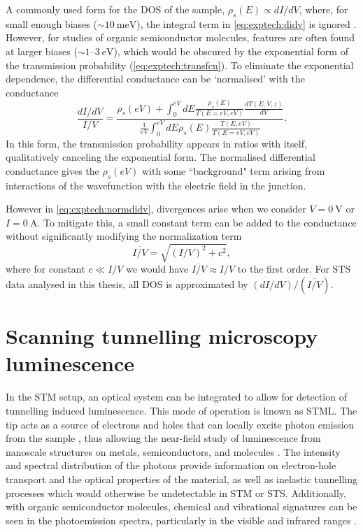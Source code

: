 A commonly used form for the \ac{DOS} of the sample, $\rho_s(E) \propto dI/dV $, where, for small enough biases ($\sim \SI{10}{\milli\electronvolt}$), the integral term in \autoref{eq:exptech:didv} is ignored \citep{feenstra1993methods}. However, for studies of organic semiconductor molecules, features are often found at larger biases ($\sim 1$--$\SI{3}{\electronvolt}$), which would be obscured by the exponential form of the transmission probability (\autoref{eq:exptech:transfcn}). To eliminate the exponential dependence, the differential conductance can be `normalised' with the conductance  \citep{feenstra1987atom}
\begin{equation} \label{eq:exptech:normdidv}
\frac{dI/dV}{I/V} = \frac{\rho_s(eV) + \int_0 ^{eV} dE \frac{\rho_s(E)}{T(E=eV,eV)} \frac{dT(E,V,z)}{dV}}{ \frac{1}{eV} \int_0^{eV} dE \rho_s(E) \frac{T(E,eV)}{T(E=eV,eV)}}.
\end{equation}
In this form, the transmission probability appears in ratios with itself, qualitatively canceling the exponential form. The normalised differential conductance gives the $\rho_s(eV)$ with some ``background" term arising from interactions of the wavefunction with the electric field in the junction.

However in \autoref{eq:exptech:normdidv}, divergences arise when we consider $V=\SI{0}{\volt}$ or $I= \SI{0}{\ampere}$. To mitigate this, a small constant term can be added to the conductance without significantly modifying the normalization term \citep{prietsch1991structural}
\begin{equation}
    \overline{I/V} = \sqrt{(I/V)^2 + c^2},
\end{equation}
where for constant $c\ll I/V$ we would have $\overline{I/V} \approx I/V$ to the first order. For \ac{STS} data analysed in this thesis, all \ac{DOS} is approximated by $ (dI/dV) / (\overline{I/V})$.

\section{Scanning tunnelling microscopy luminescence}

In the \ac{STM} setup, an optical system can be integrated to allow for detection of tunnelling induced luminescence. This mode of operation is known as \acf{STML}. The tip acts as a source of electrons and holes that can locally excite photon emission from the sample \citep{gimzewski1988photon}, thus allowing the near-field study of luminescence from nanoscale structures on metals, semiconductors, and molecules \citep{Qiu2003}. The intensity and spectral distribution of the photons provide information on electron-hole transport and the optical properties of the material, as well as inelastic tunnelling processes which would otherwise be undetectable in \ac{STM} or \ac{STS}. Additionally, with organic semiconductor molecules, chemical and vibrational signatures can be seen in the photoemission spectra, particularly in the visible and infrared ranges \citep{Qiu2003,Wu2008}.

